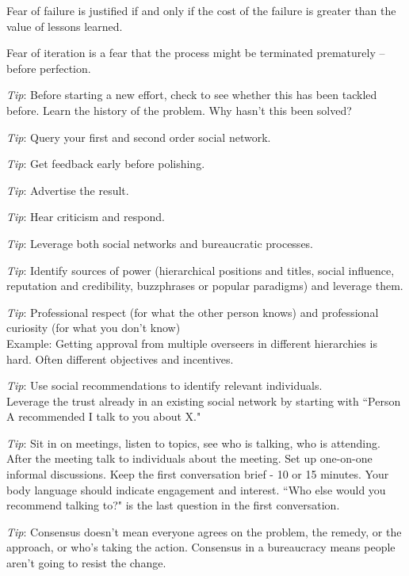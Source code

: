 Fear of failure is justified if and only if the cost of the failure is greater than the value of lessons learned.

Fear of iteration is a fear that the process might be terminated prematurely -- before perfection.

\textit{Tip}: Before starting a new effort, check to see whether this has been tackled before.
Learn the history of the problem. Why hasn't this been solved?

\textit{Tip}: Query your first and second order social network.

\textit{Tip}: Get feedback early before polishing.

\textit{Tip}: Advertise the result.

\textit{Tip}: Hear criticism and respond.

\textit{Tip}: Leverage both social networks and bureaucratic processes. 

\textit{Tip}: Identify sources of power (hierarchical positions and titles, social influence, reputation and credibility, buzzphrases or popular paradigms) and leverage them.

\textit{Tip}: Professional respect (for what the other person knows) and professional curiosity (for what you don't know) \\
Example: Getting approval from multiple overseers in different hierarchies is hard. Often different objectives and incentives.

\textit{Tip}: Use social recommendations to identify relevant individuals.\\
Leverage the trust already in an existing social network by starting with ``Person A recommended I talk to you about X."

\textit{Tip}: Sit in on meetings, listen to topics, see who is talking, who is attending. After the meeting talk to individuals about the meeting. Set up one-on-one informal discussions. Keep the first conversation  brief - 10 or 15 minutes. Your body language should indicate engagement and interest. ``Who else would you recommend talking to?" is the last question in the first conversation.


\textit{Tip}: Consensus doesn't mean everyone agrees on the problem, the remedy, or the approach, or who's taking the action. Consensus in a bureaucracy means people aren't going to resist the change.